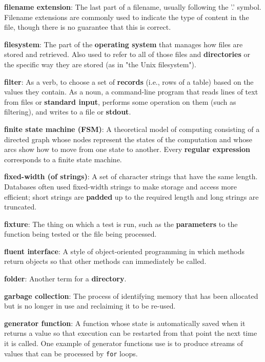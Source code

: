 \documentclass[krantzl]{krantz}
\newcommand{\glosskey}[1]{\textbf{#1}}
\begin{document}
\noindent \textbf{\glosskey{filename extension}}: 
The last part of a filename, usually following the '.' symbol. Filename extensions are commonly used to indicate the type of content in the file, though there is no guarantee that this is correct.


\noindent \textbf{\glosskey{filesystem}}: 
The part of the \glosskey{operating system} that manages how files are stored and retrieved. Also used to refer to all of those files and \glosskey{directories} or the specific way they are stored (as in "the Unix filesystem").


\noindent \textbf{\glosskey{filter}}: 
As a verb, to choose a set of \glosskey{records} (i.e., rows of a table) based on the values they contain. As a noun, a command-line program that reads lines of text from files or \glosskey{standard input}, performs some operation on them (such as filtering), and writes to a file or \glosskey{stdout}.


\noindent \textbf{\glosskey{finite state machine} (FSM)}: 
A theoretical model of computing consisting of a directed graph whose nodes represent the states of the computation and whose arcs show how to move from one state to another. Every \glosskey{regular expression} corresponds to a finite state machine.


\noindent \textbf{\glosskey{fixed-width (of strings)}}: 
A set of character strings that have the same length. Databases often used fixed-width strings to make storage and access more efficient; short strings are \glosskey{padded} up to the required length and long strings are truncated.


\noindent \textbf{\glosskey{fixture}}: 
The thing on which a test is run, such as the \glosskey{parameters} to the function being tested or the file being processed.


\noindent \textbf{\glosskey{fluent interface}}: 
A style of object-oriented programming in which methods return objects so that other methods can immediately be called.


\noindent \textbf{\glosskey{folder}}: 
Another term for a \glosskey{directory}.


\noindent \textbf{\glosskey{garbage collection}}: 
The process of identifying memory that has been allocated but is no longer in use and reclaiming it to be re-used.


\noindent \textbf{\glosskey{generator function}}: 
A function whose state is automatically saved when it returns a value so that execution can be restarted from that point the next time it is called. One example of generator functions use is to produce streams of values that can be processed by \texttt{for} loops.
\end{document}

